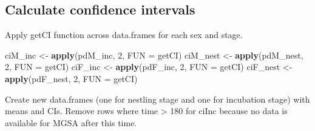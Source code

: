 \documentclass[]{article}
\newenvironment{Shaded}{\begin{snugshade}}{\end{snugshade}}
\newcommand{\DataTypeTok}[1]{\textcolor[rgb]{0.13,0.29,0.53}{#1}}
\newcommand{\DecValTok}[1]{\textcolor[rgb]{0.00,0.00,0.81}{#1}}
\newcommand{\KeywordTok}[1]{\textcolor[rgb]{0.13,0.29,0.53}{\textbf{#1}}}
\newcommand{\NormalTok}[1]{#1}
\newcommand{\StringTok}[1]{\textcolor[rgb]{0.31,0.60,0.02}{#1}}
\begin{document}
\hypertarget{calculate-confidence-intervals}{%
\subsection{Calculate confidence
intervals}\label{calculate-confidence-intervals}}

Apply getCI function across data.frames for each sex and stage.

\begin{Shaded}
\begin{Highlighting}[]
\NormalTok{ciM_inc <-}\StringTok{ }\KeywordTok{apply}\NormalTok{(pdM_inc, }\DecValTok{2}\NormalTok{, }\DataTypeTok{FUN =}\NormalTok{ getCI)}
\NormalTok{ciM_nest <-}\StringTok{ }\KeywordTok{apply}\NormalTok{(pdM_nest, }\DecValTok{2}\NormalTok{, }\DataTypeTok{FUN =}\NormalTok{ getCI)}
\NormalTok{ciF_inc <-}\StringTok{ }\KeywordTok{apply}\NormalTok{(pdF_inc, }\DecValTok{2}\NormalTok{, }\DataTypeTok{FUN =}\NormalTok{ getCI)}
\NormalTok{ciF_nest <-}\StringTok{ }\KeywordTok{apply}\NormalTok{(pdF_nest, }\DecValTok{2}\NormalTok{, }\DataTypeTok{FUN =}\NormalTok{ getCI)}
\end{Highlighting}
\end{Shaded}

Create new data.frames (one for nestling stage and one for incubation
stage) with means and CIs. Remove rows where time \textgreater{} 180 for
ciInc because no data is available for MGSA after this time.
\end{document}
